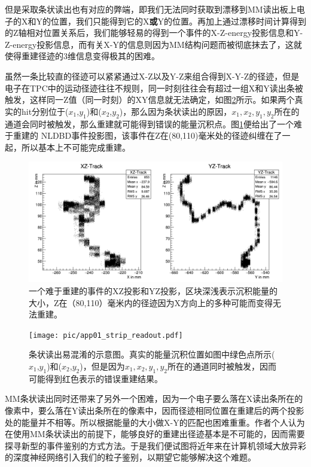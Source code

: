 但是采取条状读出也有对应的弊端，即我们无法同时获取到漂移到MM读出板上电子的X和Y的位置，我们只能得到它的X\textbf{或}Y的位置。再加上通过漂移时间计算得到的Z轴相对位置关系后，我们能够轻易的得到一个事件的X-Z-energy投影信息和Y-Z-energy投影信息，而有关X-Y的信息则因为MM结构问题而被彻底抹去了，这就使得重建径迹的3维信息变得极其的困难。

虽然一条比较直的径迹可以紧紧通过X-Z以及Y-Z来组合得到X-Y-Z的径迹，但是电子在TPC中的运动径迹往往不规则，同一时刻往往会有超过一组X和Y读出条被触发，这样同一Z值（同一时刻）的XY信息就无法确定，如图\ref{fig:difficulty_track_2}所示。如果两个真实的hit分别位于($x_1$,$y_1$)和($x_2$,$y_2$)，那么因为条状读出的原因，$x_1,x_2,y_1,y_2$所在的通道会同时被触发，那么重建就可能得到错误的能量沉积点。图\ref{fig:difficulty_track}便给出了一个难于重建的
NLDBD事件投影图，该事件在Z在(80,110)毫米处的径迹纠缠在了一起，所以基本上不可能完成重建。

\begin{figure}
    \centering
    \includegraphics[width=0.7\columnwidth]{pic/difficulty_track.png}
    \caption{一个难于重建的事件的XZ投影和YZ投影，区块深浅表示沉积能量的大小，Z在（80,110）毫米内的径迹因为X方向上的多种可能而变得无法重建。}
    \label{fig:difficulty_track}
\end{figure}

\begin{figure}
    \centering
    \texttt{[image: pic/app01\_strip\_readout.pdf]}
    \caption{条状读出易混淆的示意图。真实的能量沉积位置如图中绿色点所示($x_1$,$y_1$)和($x_2$,$y_2$)，但是因为$x_1,x_2,y_1,y_2$所在的通道同时被触发，因而可能得到红色表示的错误重建结果。}
    \label{fig:difficulty_track_2}
\end{figure}

MM条状读出同时还带来了另外一个困难，因为一个电子要么落在X读出条所在的像素中，要么落在Y读出条所在的像素中，因而径迹相同位置在重建后的两个投影处的能量并不相等。所以根据能量的大小做X-Y的匹配也困难重重。作者个人认为在使用MM条状读出的前提下，能够良好的重建出径迹基本是不可能的，因而需要探寻新型的事件鉴别的方式方法。于是我们便试图将近年来在计算机领域大放异彩的深度神经网络引入我们的粒子鉴别，以期望它能够解决这个难题。

